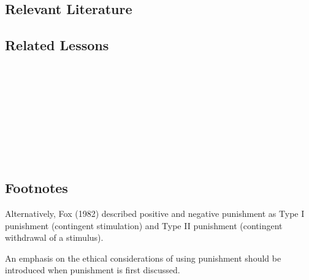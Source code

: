\subsection{Relevant Literature}
\begin{refsection}
\nocite{bailey2013ethics,
    cooper2007applied,
    foxx1982decreasing,
    van1988right}
\printbibliography[heading=none]
\end{refsection} 
%
\subsection{Related Lessons}
\fourdOne{}\\
\fourdSeventeen{}\\
\fourdNineteen{}\\
\foureEleven{}\\
\fourgSeven{}\\
\fourjTen{}\\
\fourFKNineteen{}\\
\fourFKTwenty{}\\
%
\subsection{Footnotes}
Alternatively, Fox (1982) described positive and negative punishment as Type I punishment (contingent stimulation) and Type II punishment (contingent withdrawal of a stimulus).

An emphasis on the ethical considerations of using punishment should be introduced when punishment is first discussed.
